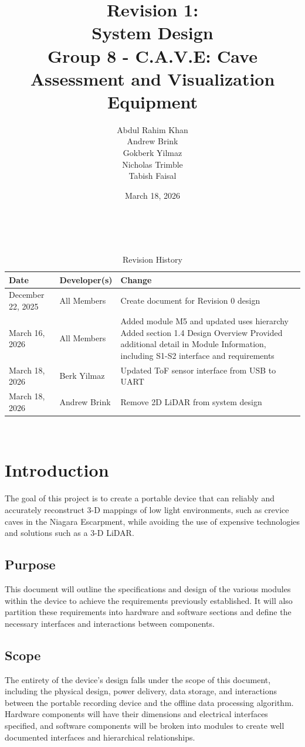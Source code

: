 \documentclass[11pt]{article}
\title{\textbf{Revision 1: \\ System Design \\ \large Group 8 - C.A.V.E: Cave Assessment and Visualization Equipment}}
\author{Abdul Rahim Khan \\ Andrew Brink \\ Gokberk Yilmaz \\ Nicholas Trimble \\ Tabish Faisal}
\date{March 18, 2026}
\begin{document}
	\fussy
	\maketitle
	~\newpage
	\setcounter{table}{-1}
	\begin{table}[hp]
		\caption{Revision History} \label{TblRevisionHistory}
		\begin{tabularx}{\textwidth}{llX}
			\toprule
			\textbf{Date} & \textbf{Developer(s)} & \textbf{Change}\\
			\midrule
			December 22, 2025 & All Members & Create document for Revision 0 design\\
            \midrule
            March 16, 2026 & All Members & Added module M5 and updated uses hierarchy \newline 
                Added section 1.4 Design Overview \newline
                Provided additional detail in Module Information, including S1-S2 interface and requirements \\
			\midrule
            March 18, 2026 & Berk Yilmaz & Updated ToF sensor interface from USB to UART \\
            \midrule
            March 18, 2026 & Andrew Brink & Remove 2D LiDAR from system design\\
			\bottomrule
		\end{tabularx}
	\end{table}
    ~\newpage
	\section{Introduction}
		The goal of this project is to create a portable device that can reliably and accurately reconstruct 3-D mappings of low light environments, such as crevice caves in the Niagara Escarpment, while avoiding the use of expensive technologies and solutions such as a 3-D LiDAR.
		\subsection{Purpose}
			This document will outline the specifications and design of the various modules within the device to achieve the requirements previously established. It will also partition these requirements into hardware and software sections and define the necessary interfaces and interactions between components. 
		\subsection{Scope}
			The entirety of the device’s design falls under the scope of this document, including the physical design, power delivery, data storage, and interactions between the portable recording device and the offline data processing algorithm. Hardware components will have their dimensions and electrical interfaces specified, and software components will be broken into modules to create well documented interfaces and hierarchical relationships. 
\end{document}
